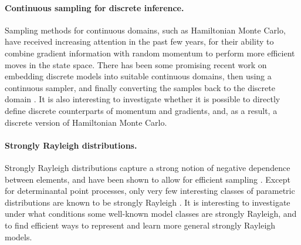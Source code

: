 \paragraph{Continuous sampling for discrete inference.}
Sampling methods for continuous domains, such as Hamiltonian Monte Carlo, have received increasing attention in the past few years, for their ability to combine gradient information with random momentum to perform more efficient moves in the state space.
There has been some promising recent work on embedding discrete models into suitable continuous domains, then using a continuous sampler, and finally converting the samples back to the discrete domain \citep{zhang12,pakman13,dinh17,nishimura18}.
It is also interesting to investigate whether it is possible to directly define discrete counterparts of momentum and gradients, and, as a result, a discrete version of Hamiltonian Monte Carlo.

\paragraph{Strongly Rayleigh distributions.}
Strongly Rayleigh distributions \citep{borcea08} capture a strong notion of negative dependence between elements, and have been shown to allow for efficient sampling \citep{anari16,li16}.
Except for determinantal point processes, only very few interesting classes of parametric distributions are known to be strongly Rayleigh \citep{li17}.
It is interesting to investigate under what conditions some well-known model classes are strongly Rayleigh, and to find efficient ways to represent and learn more general strongly Rayleigh models.